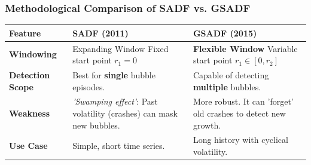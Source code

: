 \documentclass{beamer}
\begin{document}
\begin{frame}
\frametitle{Methodological Comparison of SADF vs. GSADF \citep{Phillips2015}}


    \begin{table}
        \centering
        \renewcommand{\arraystretch}{1.5}
        \begin{tabular}{p{2cm} p{4.3cm} p{4.8cm}}
            \toprule
            \textbf{Feature} & \textbf{SADF (2011)} & \textbf{GSADF (2015)} \\
            \midrule
            \textbf{Windowing} & {Expanding Window} \newline Fixed start point $r_1 = 0$ & \textbf{Flexible Window} \newline Variable start point $r_1 \in [0, r_2]$ \\
            
            \textbf{Detection Scope} & Best for \textbf{single} bubble episodes. & Capable of detecting \textbf{multiple} bubbles. \\
            
            \textbf{Weakness} & \textit{'Swamping effect'}: Past volatility (crashes) can mask new bubbles. & More robust. It can 'forget' old crashes to detect new growth. \\
            
            \textbf{Use Case} & Simple, short time series. & Long history with cyclical volatility. \\
            \bottomrule
        \end{tabular}
    \end{table}

\end{frame}
\end{document}
